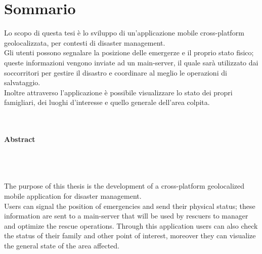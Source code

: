 \chapter*{Sommario}
\thispagestyle{empty}

Lo scopo di questa tesi è lo sviluppo di un'applicazione mobile cross-platform geolocalizzata, per contesti di disaster management.\\
 Gli utenti possono segnalare la posizione delle emergerze e il proprio stato fisico; queste informazioni vengono inviate ad un main-server, il quale sarà utilizzato dai soccorritori per gestire il disastro e coordinare al meglio le operazioni di salvataggio.\\
  Inoltre attraverso l'applicazione è possibile visualizzare lo stato dei propri famigliari, dei luoghi d'interesse e quello generale dell'area colpita.
\\
\\
\\
\noindent
\begin{Huge}
\textbf{Abstract}
\end{Huge}
\\
\\
\\
\noindent
The purpose of this thesis is the development of a cross-platform geolocalized mobile application for disaster management.\\
 Users can signal the position of emergencies and send their physical status; these information are sent to a main-server that will be used by rescuers to manager and optimize the rescue operations. Through this application users can also check the status of their family and other point of interest, moreover they can visualize the general state of the area affected.
